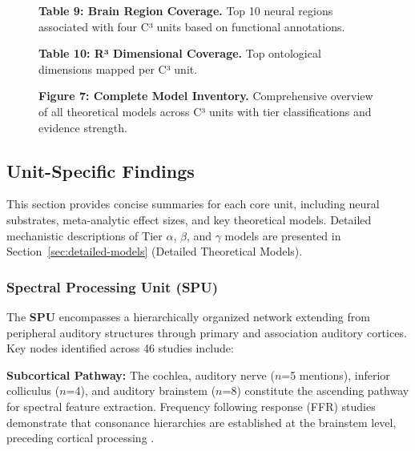 \documentclass[9pt,onecolumn]{article}
\newcommand{\SPU}{\textcolor{spucolor}{\textbf{SPU}}}
\begin{document}
\begin{figure}[H]
\centering
\vspace{0.3em}
{\fontsize{7}{8.4}\selectfont\textbf{Table 9: Brain Region Coverage.} Top 10 neural regions associated with four C³ units based on functional annotations.}
\label{tab:brain-regions}
\end{figure}

\begin{figure}[H]
\centering
\vspace{0.3em}
{\fontsize{7}{8.4}\selectfont\textbf{Table 10: R³ Dimensional Coverage.} Top ontological dimensions mapped per C³ unit.}
\label{tab:r3-coverage}
\end{figure}

\clearpage
\onecolumn
\begin{figure}[H]
\centering
\vspace{0.5em}

{\fontsize{8}{9.6}\selectfont\textbf{Figure 7: Complete Model Inventory.} Comprehensive overview of all theoretical models across C³ units with tier classifications and evidence strength.}
\label{fig:complete-model-inventory}
\end{figure}
\clearpage
\twocolumn

\subsection{Unit-Specific Findings}

This section provides concise summaries for each core unit, including neural substrates, meta-analytic effect sizes, and key theoretical models. Detailed mechanistic descriptions of Tier $\alpha$, $\beta$, and $\gamma$ models are presented in Section~\ref{sec:detailed-models} (Detailed Theoretical Models).

\subsubsection{Spectral Processing Unit (\SPU{})}

The \SPU{} encompasses a hierarchically organized network extending from peripheral auditory structures through primary and association auditory cortices. Key nodes identified across 46 studies include:

\textbf{Subcortical Pathway:} The cochlea, auditory nerve ($n$=5 mentions), inferior colliculus ($n$=4), and auditory brainstem ($n$=8) constitute the ascending pathway for spectral feature extraction. Frequency following response (FFR) studies demonstrate that consonance hierarchies are established at the brainstem level, preceding cortical processing \citep{bidelman2013}.
\end{document}
